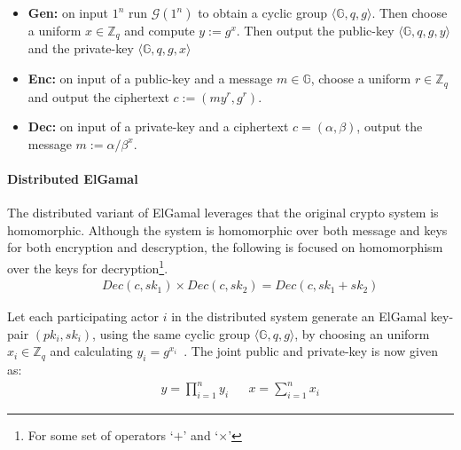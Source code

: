 \begin{itemize}
    \item \textbf{Gen:} on input $1^n$ run $\mathcal{G}(1^n)$ to obtain a cyclic group $\langle \mathbb{G},q,g \rangle$. Then choose a uniform $x \in \mathbb{Z}_q$ and compute $y := g^x$. Then output the public-key $\langle \mathbb{G},q,g,y \rangle$ and the private-key $\langle \mathbb{G},q,g,x \rangle$
    
    \item \textbf{Enc:} on input of a public-key and a message $m \in \mathbb{G}$, choose a uniform $r \in \mathbb{Z}_q$ and output the ciphertext $c := ( my^r, g^r )$.
    
    
    \item \textbf{Dec:} on input of a private-key and a ciphertext $c = ( \alpha, \beta )$, output the message $m := \alpha / \beta^x$.
    
\end{itemize}

\paragraph{Distributed ElGamal}\label{sec:deg}

The distributed variant of ElGamal leverages that the original crypto system is homomorphic. Although the system is homomorphic over both message and keys for both encryption and descryption, the following is focused on homomorphism over the keys for decryption\footnote{For some set of operators `$+$' and `$\times$'}. 
{\setlength{\mathindent}{0cm}
\begin{align*}
&&    Dec(c,sk_1) \times Dec(c,sk_2) = Dec(c,sk_1 + sk_2)
\end{align*}}\vspace{-1em}

Let each participating actor $i$ in the distributed system generate an ElGamal key-pair $( pk_i, sk_i )$, using the same cyclic group $\langle \mathbb{G}, q, g \rangle$, by choosing an uniform $x_i \in \mathbb{Z}_q$ and calculating $y_i = g^{x_i}$~\cite{brandt2005efficient}. The joint public and private-key is now given as: 
{\setlength{\mathindent}{0cm}
\begin{align*}
&& y = \prod^n_{i=1} y_i && x = \sum^n_{i=1} x_i
\end{align*}}

